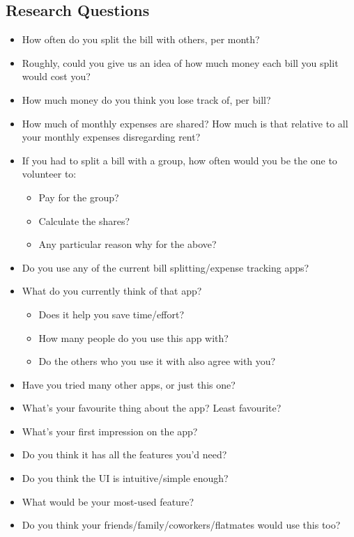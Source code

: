 \documentclass[a4wide, 11pt]{article}
\begin{document}
\subsection{Research Questions}
\label{resQn}
\begin{itemize}
  \item How often do you split the bill with others, per month?
  \item Roughly, could you give us an idea of how much money each bill you split would cost you?
  \item How much money do you think you lose track of, per bill?
  \item How much of monthly expenses are shared? How much is that relative to all your monthly expenses disregarding rent?
  \item If you had to split a bill with a group, how often would you be the one to volunteer to:
  \begin{itemize}
    \item Pay for the group?
    \item Calculate the shares?
    \item Any particular reason why for the above?
  \end{itemize}
  \item Do you use any of the current bill splitting/expense tracking apps?
  \item What do you currently think of that app?
  \begin{itemize}
    \item Does it help you save time/effort?
    \item How many people do you use this app with?
    \item Do the others who you use it with also agree with you?
  \end{itemize}
  \item Have you tried many other apps, or just this one?
  \item What’s your favourite thing about the app? Least favourite?
  \item What’s your first impression on the app?
  \item Do you think it has all the features you’d need?
  \item Do you think the UI is intuitive/simple enough?
  \item What would be your most-used feature?
  \item Do you think your friends/family/coworkers/flatmates would use this too?
\end{itemize}
\end{document}
